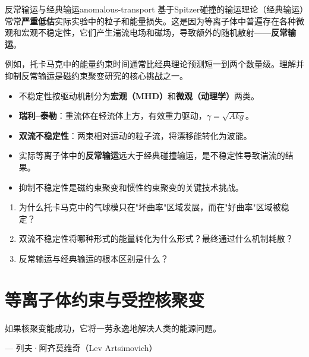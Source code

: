 \documentclass[12pt,a4paper,openany,oneside]{book}
\begin{document}
\begin{warning}{反常输运与经典输运}{anomalous-transport}
基于Spitzer碰撞的输运理论（经典输运）常常\textbf{严重低估}实际实验中的粒子和能量损失。这是因为等离子体中普遍存在各种微观和宏观不稳定性，它们产生湍流电场和磁场，导致额外的随机散射——\textbf{反常输运}。

例如，托卡马克中的能量约束时间通常比经典理论预测短一到两个数量级。理解并抑制反常输运是磁约束聚变研究的核心挑战之一。
\end{warning}

\begin{chapterreview}
\begin{itemize}
\item 不稳定性按驱动机制分为\textbf{宏观（MHD）}和\textbf{微观（动理学）}两类。
\item \textbf{瑞利--泰勒}：重流体在轻流体上方，有效重力驱动，$\gamma = \sqrt{Akg}$。
\item \textbf{双流不稳定性}：两束相对运动的粒子流，将漂移能转化为波能。
\item 实际等离子体中的\textbf{反常输运}远大于经典碰撞输运，是不稳定性导致湍流的结果。
\item 抑制不稳定性是磁约束聚变和惯性约束聚变的关键技术挑战。
\end{itemize}
\end{chapterreview}

\begin{miniquiz}
\begin{enumerate}
\item 为什么托卡马克中的气球模只在"坏曲率"区域发展，而在"好曲率"区域被稳定？
\item 双流不稳定性将哪种形式的能量转化为什么形式？最终通过什么机制耗散？
\item 反常输运与经典输运的根本区别是什么？
\end{enumerate}
\end{miniquiz}




\chapter{等离子体约束与受控核聚变}\label{ch:10}
\epigraph{如果核聚变能成功，它将一劳永逸地解决人类的能源问题。}{--- 列夫·阿齐莫维奇（Lev Artsimovich）}
\end{document}
